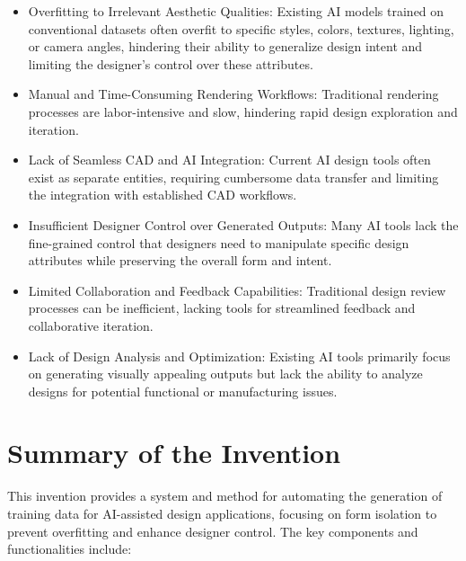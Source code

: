 \documentclass{article}
\begin{document}
\begin{itemize}
    \item Overfitting to Irrelevant Aesthetic Qualities: Existing AI models trained on conventional datasets often overfit to specific styles, colors, textures, lighting, or camera angles, hindering their ability to generalize design intent and limiting the designer's control over these attributes.
    \item Manual and Time-Consuming Rendering Workflows: Traditional rendering processes are labor-intensive and slow, hindering rapid design exploration and iteration.
    \item Lack of Seamless CAD and AI Integration: Current AI design tools often exist as separate entities, requiring cumbersome data transfer and limiting the integration with established CAD workflows.
    \item Insufficient Designer Control over Generated Outputs: Many AI tools lack the fine-grained control that designers need to manipulate specific design attributes while preserving the overall form and intent.
    \item Limited Collaboration and Feedback Capabilities: Traditional design review processes can be inefficient, lacking tools for streamlined feedback and collaborative iteration.
    \item Lack of Design Analysis and Optimization: Existing AI tools primarily focus on generating visually appealing outputs but lack the ability to analyze designs for potential functional or manufacturing issues.
\end{itemize}

\section{Summary of the Invention}

This invention provides a system and method for automating the generation of training data for AI-assisted design applications, focusing on form isolation to prevent overfitting and enhance designer control. The key components and functionalities include:
\end{document}
